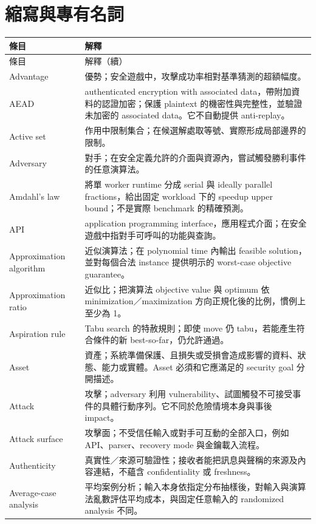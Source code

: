 \documentclass[11pt,a4paper,oneside,openany]{book}
\begin{document}
\section*{縮寫與專有名詞}
\begin{longtable}{@{}>{\raggedright\arraybackslash}p{}p{}@{}}
\toprule
條目 & 解釋 \\
\midrule
\endfirsthead
\toprule
條目 & 解釋（續） \\
\midrule
\endhead
Advantage & 優勢；安全遊戲中，攻擊成功率相對基準猜測的超額幅度。 \\
AEAD & authenticated encryption with associated data，帶附加資料的認證加密；保護 plaintext 的機密性與完整性，並驗證未加密的 associated data。它不自動提供 anti-replay。 \\
Active set & 作用中限制集合；在候選解處取等號、實際形成局部邊界的限制。 \\
Adversary & 對手；在安全定義允許的介面與資源內，嘗試觸發勝利事件的任意演算法。 \\
Amdahl's law & 將單 worker runtime 分成 serial 與 ideally parallel fractions，給出固定 workload 下的 speedup upper bound；不是實際 benchmark 的精確預測。 \\
API & application programming interface，應用程式介面；在安全遊戲中指對手可呼叫的功能與查詢。 \\
Approximation algorithm & 近似演算法；在 polynomial time 內輸出 feasible solution，並對每個合法 instance 提供明示的 worst-case objective guarantee。 \\
Approximation ratio & 近似比；把演算法 objective value 與 optimum 依 minimization／maximization 方向正規化後的比例，慣例上至少為 1。 \\
Aspiration rule & Tabu search 的特赦規則；即使 move 仍 tabu，若能產生符合條件的新 best-so-far，仍允許通過。 \\
Asset & 資產；系統準備保護、且損失或受損會造成影響的資料、狀態、能力或實體。Asset 必須和它應滿足的 security goal 分開描述。 \\
Attack & 攻擊；adversary 利用 vulnerability、試圖觸發不可接受事件的具體行動序列。它不同於危險情境本身與事後 impact。 \\
Attack surface & 攻擊面；不受信任輸入或對手可互動的全部入口，例如 API、parser、recovery mode 與金鑰載入流程。 \\
Authenticity & 真實性／來源可驗證性；接收者能把訊息與聲稱的來源及內容連結，不蘊含 confidentiality 或 freshness。 \\
Average-case analysis & 平均案例分析；輸入本身依指定分布抽樣後，對輸入與演算法亂數評估平均成本，與固定任意輸入的 randomized analysis 不同。 \\

\end{longtable}
\end{document}

